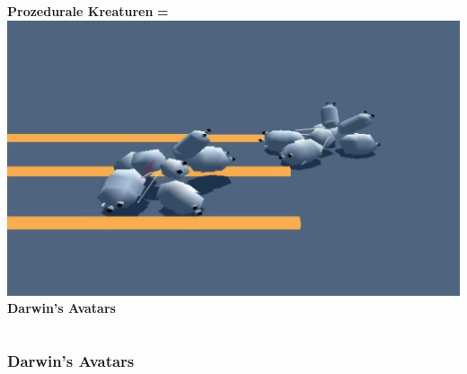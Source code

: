 \documentclass{beamer}
\begin{document}
\begin{frame}
\begin{columns}[c]
		\vspace{1.5em}
		\textbf{Prozedurale Kreaturen}
		\pause
		\centering
		\textbf{\huge =}
		\centering
		\includegraphics[width=\textwidth]{img/games/darwin.png} \\
		\vspace{1.5em}
		\textbf{Darwin's Avatars}
	\end{columns}
	
\end{frame}


\begin{frame}
	\frametitle{Darwin's Avatars}	
\end{frame}

\usebackgroundtemplate{}
\end{document}
